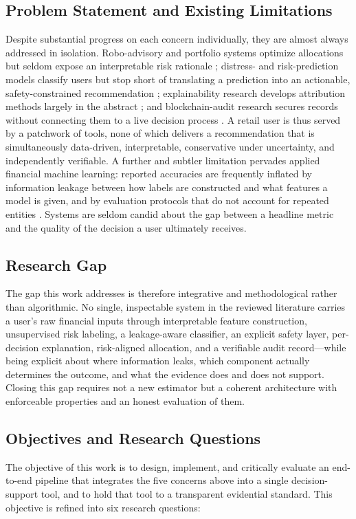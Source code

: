 \subsection{Problem Statement and Existing Limitations}\label{subsec:problem}
Despite substantial progress on each concern individually, they are almost always
addressed in isolation. Robo-advisory and portfolio systems optimize allocations but
seldom expose an interpretable risk rationale \cite{ref8,ref12}; distress- and
risk-prediction models classify users but stop short of translating a prediction into
an actionable, safety-constrained recommendation \cite{ref18,ref19}; explainability
research develops attribution methods largely in the abstract \cite{ref10,ref21}; and
blockchain-audit research secures records without connecting them to a live decision
process \cite{ref13,ref14,ref15}. A retail user is thus served by a patchwork of
tools, none of which delivers a recommendation that is simultaneously data-driven,
interpretable, conservative under uncertainty, and independently verifiable. A further
and subtler limitation pervades applied financial machine learning: reported
accuracies are frequently inflated by information leakage between how labels are
constructed and what features a model is given, and by evaluation protocols that do
not account for repeated entities \cite{ref4}. Systems are seldom candid about the gap
between a headline metric and the quality of the decision a user ultimately receives.

\subsection{Research Gap}\label{subsec:gap}
The gap this work addresses is therefore integrative and methodological rather than
algorithmic. No single, inspectable system in the reviewed literature carries a user's
raw financial inputs through interpretable feature construction, unsupervised risk
labeling, a leakage-aware classifier, an explicit safety layer, per-decision
explanation, risk-aligned allocation, and a verifiable audit record---while being
explicit about where information leaks, which component actually determines the
outcome, and what the evidence does and does not support. Closing this gap requires not
a new estimator but a coherent architecture with enforceable properties and an honest
evaluation of them.

\subsection{Objectives and Research Questions}\label{subsec:rqs}
The objective of this work is to design, implement, and critically evaluate an
end-to-end pipeline that integrates the five concerns above into a single
decision-support tool, and to hold that tool to a transparent evidential standard.
This objective is refined into six research questions:

